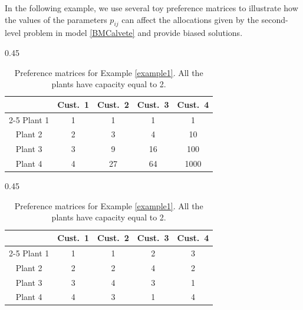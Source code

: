 \documentclass[preprint,11pt,authoryear]{elsarticle}
\def\J{\mathcal{J}}
\def\I{\mathcal{I}}
\begin{document}
In the following example, we use several toy preference matrices to illustrate how the values of the parameters $p_{ij}$ can affect the allocations given by the second-level problem in model \eqref{BMCalvete} and provide biased solutions.

\begin{table}%
    \begin{subtable}[h]{0.45\textwidth}
    \centering
    \begin{tabular}{ccccc}
    \toprule    
     & Cust.\ 1 & Cust.\ 2 & Cust.\ 3 & Cust.\ 4  \\ \cmidrule(lr){2-5}
    Plant 1 & 1 &  1 & 1 & 1  \\ 
    Plant 2 & 2 &  3 & 4 & 10 \\ 
    Plant 3 & 3 &  9 & 16 & 100 \\
    Plant 4 & 4 &  27 & 64 & 1000 \\
    \bottomrule
\end{tabular}
       \caption{$p_{ij}\notin \{1,\dots,4\}$, $\forall i \in \I$, $j \in \J$}
       \label{tab:toyexample1a}
    \end{subtable}
\hfill
    \begin{subtable}[h]{0.45\textwidth}
    \centering
    \begin{tabular}{ccccc}
    \toprule    
     & Cust.\ 1 & Cust.\ 2 & Cust.\ 3 & Cust.\ 4  \\ \cmidrule(lr){2-5}
    Plant 1 & 1 &  1 & 2 & 3  \\ 
    Plant 2 & 2 &  2 & 4 & 2 \\ 
    Plant 3 & 3 &  4 & 3 & 1 \\
    Plant 4 & 4 &  3 & 1 & 4 \\
    \bottomrule
\end{tabular}
       \caption{$p_{ij}\in \{1,\dots,4\}$, $\forall i \in \I$, $j \in \J$}
       \label{tab:toyexample1b}
    \end{subtable}
\caption{Preference matrices for Example \ref{example1}. All the plants have capacity equal to 2.} 
\label{tab:toyexample1}
\end{table}
\end{document}
